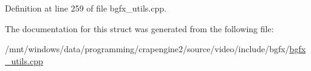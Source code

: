 Definition at line 259 of file bgfx\+\_\+utils.\+cpp.



The documentation for this struct was generated from the following file\+:\begin{DoxyCompactItemize}
\item 
/mnt/windows/data/programming/crapengine2/source/video/include/bgfx/\hyperlink{bgfx__utils_8cpp}{bgfx\+\_\+utils.\+cpp}\end{DoxyCompactItemize}
